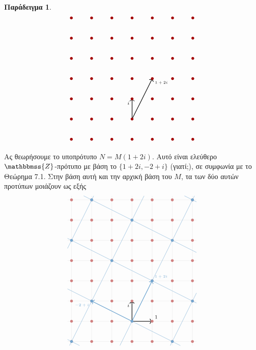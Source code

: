 \documentclass[12pt,a4paper,reqno]{amsart}
\theoremstyle{definition}
\newtheorem{example}[theorem]{Παράδειγμα}
\theoremstyle{remark}
\numberwithin{theorem}{section}
\numberwithin{exercise}{section}
\numberwithin{equation}{section}
\newcommand{\ZZ}{\mathbbmss{Z}}
\begin{document}
\begin{example}
\[\begin{tikzpicture}[scale=1]
    \draw[->, thick] (0,-2) -- (0,-1) node[below left] {\scriptsize{$i$}};
    \draw[->, thick] (0,-2) -- (1,0) node[below right] {\tiny{$1 + 2i$}};

    \foreach \x in {-3,-2,-1,0,1,2,3}
            \foreach \y in {-3,-2,-1,0,1,2,3}
            \fill[darkcandyapplered] (\x,\y) circle (2pt);

    \end{tikzpicture}
    \]

    Ας θεωρήσουμε το υποπρότυπο $N = M(1+2i)$. Αυτό είναι ελεύθερο $\ZZ$-πρότυπο με βάση το $\{1+2i, -2+i\}$ (γιατί;), σε συμφωνία με το Θεώρημα 7.1.
    Στην βάση αυτή και την αρχική βάση του $M$, τα  των δύο αυτών προτύπων μοιάζουν ως εξής
    \[
    \begin{tikzpicture}[scale=1]
        \draw[step=1cm, gray!20, thin] (-3.2,-1.2) grid (3.2,6.2);

        \draw[->, thick] (0,0) -- (0,1) node[below left] {\scriptsize{$i$}};
        \draw[->, thick] (0,0) -- (1,0) node[above right] {\scriptsize{$1$}};

        \foreach \x in {-3,-2,-1,0,1,2,3}
            \foreach \y in {-1,0,1,2,3,4,5,6}
            \fill[darkcandyapplered!50] (\x,\y) circle (2pt);

        \draw[->, iceberg, thick] (0,0) -- (1,2) node[above right] {\tiny{$1+2i$}};
        \draw[->, iceberg, thick] (0,0) -- (-2,1) node[below left] {\tiny{$-2+i$}};

        \draw[iceberg, thin] (-.6,-1.2) -- (3.1,6.2);
        \draw[iceberg, thin] (-3.1,-1.2) -- (.6,6.2);
        \draw[iceberg, thin] (-3.2,3.6) -- (-1.9,6.2);
        \draw[iceberg, thin] (3.2,1.4) -- (1.9,-1.2);

        \draw[iceberg, thin] (-3.2,1.6) -- (2.4,-1.2);
        \draw[iceberg, thin] (-3.2,-.9) -- (-2.6,-1.2);
        \draw[iceberg, thin] (-3.2,4.1) -- (3.2,.9);
        \draw[iceberg, thin] (-2.4,6.2) -- (3.2,3.4);
        \draw[iceberg, thin] (2.6,6.2) -- (3.2,5.9);

        \fill[iceberg] (1,2) circle (2pt);
        \fill[iceberg] (2,4) circle (2pt);
        \fill[iceberg] (3,6) circle (2pt);
        \fill[iceberg] (0,0) circle (2pt);
        \fill[iceberg] (3,1) circle (2pt);
        \fill[iceberg] (2,-1) circle (2pt);
        \fill[iceberg] (-2,1) circle (2pt);
        \fill[iceberg] (-1,3) circle (2pt);
        \fill[iceberg] (0,5) circle (2pt);
        \fill[iceberg] (-3,-1) circle (2pt);
        \fill[iceberg] (-3,4) circle (2pt);
        \fill[iceberg] (-2,6) circle (2pt);
    \end{tikzpicture}
    \]


\end{example}
\end{document}
